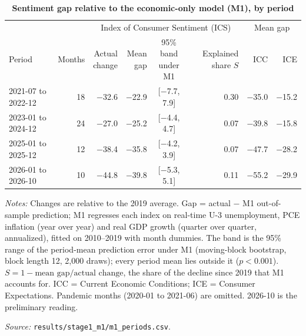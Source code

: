\begin{table}[htbp]
\centering
\begin{threeparttable}
\caption{\textbf{Sentiment gap relative to the economic-only model (M1), by period}}
\label{tab:gap}
\small
\begin{tabular}{@{}l r r r c r r r@{}}
\toprule
 & & \multicolumn{4}{c}{Index of Consumer Sentiment (ICS)} & \multicolumn{2}{c}{Mean gap}\\
\cmidrule(lr){3-6}\cmidrule(l){7-8}
Period & Months & \makecell[r]{Actual\\change} & \makecell[r]{Mean\\gap} & \makecell{95\% band\\under M1} & \makecell[r]{Explained\\share $S$} & ICC & ICE\\
\midrule
2021-07 to 2022-12 & 18 & −32.6 & −22.9 & [−7.7, 7.9] & 0.30 & −35.0 & −15.2 \\
2023-01 to 2024-12 & 24 & −27.0 & −25.2 & [−4.4, 4.7] & 0.07 & −39.8 & −15.8 \\
2025-01 to 2025-12 & 12 & −38.4 & −35.8 & [−4.2, 3.9] & 0.07 & −47.7 & −28.2 \\
2026-01 to 2026-10 & 10 & −44.8 & −39.8 & [−5.3, 5.1] & 0.11 & −55.2 & −29.9 \\
\bottomrule
\end{tabular}
\begin{tablenotes}[flushleft]\footnotesize
\item \textit{Notes:} Changes are relative to the 2019 average. Gap = actual − M1 out-of-sample prediction; M1 regresses each index on real-time U-3 unemployment, PCE inflation (year over year) and real GDP growth (quarter over quarter, annualized), fitted on 2010–2019 with month dummies. The band is the 95\% range of the period-mean prediction error under M1 (moving-block bootstrap, block length 12, 2,000 draws); every period mean lies outside it ($p < 0.001$). $S = 1 - \text{mean gap}/\text{actual change}$, the share of the decline since 2019 that M1 accounts for. ICC = Current Economic Conditions; ICE = Consumer Expectations. Pandemic months (2020-01 to 2021-06) are omitted. 2026-10 is the preliminary reading.
\item \textit{Source:} \texttt{results/stage1\_m1/m1\_periods.csv}.
\end{tablenotes}
\end{threeparttable}
\end{table}
